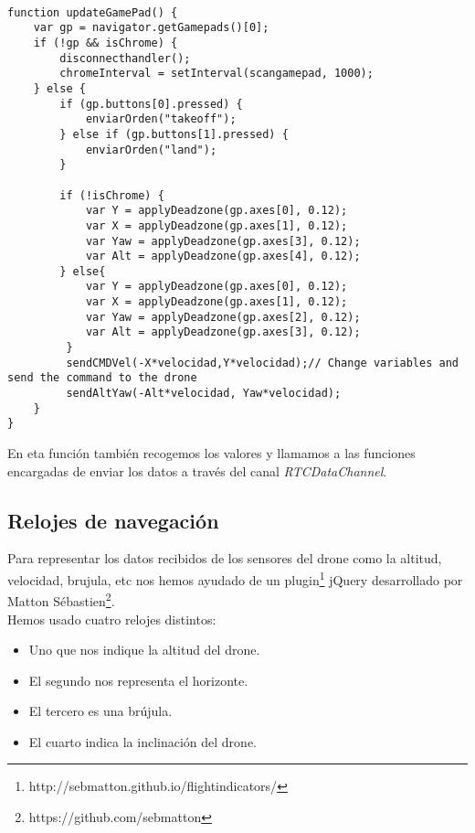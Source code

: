 \begin{lstlisting}[caption=Manajador de mando.]

function updateGamePad() {
    var gp = navigator.getGamepads()[0];
    if (!gp && isChrome) {
        disconnecthandler();
        chromeInterval = setInterval(scangamepad, 1000);        
    } else {
        if (gp.buttons[0].pressed) {
            enviarOrden("takeoff");
        } else if (gp.buttons[1].pressed) {
            enviarOrden("land");
        }
        
        if (!isChrome) {
            var Y = applyDeadzone(gp.axes[0], 0.12);
            var X = applyDeadzone(gp.axes[1], 0.12);
            var Yaw = applyDeadzone(gp.axes[3], 0.12);
            var Alt = applyDeadzone(gp.axes[4], 0.12);
        } else{
            var Y = applyDeadzone(gp.axes[0], 0.12);
            var X = applyDeadzone(gp.axes[1], 0.12);
            var Yaw = applyDeadzone(gp.axes[2], 0.12);
            var Alt = applyDeadzone(gp.axes[3], 0.12);
         }
         sendCMDVel(-X*velocidad,Y*velocidad);// Change variables and send the command to the drone
         sendAltYaw(-Alt*velocidad, Yaw*velocidad);
    }
}
\end{lstlisting}

En eta función también recogemos los valores y llamamos a las funciones encargadas de enviar los datos a través del canal \emph{RTCDataChannel}.\\


\subsection{Relojes de navegación}\label{subsec:relojesnavegacion}

Para representar los datos recibidos de los sensores del drone como la altitud, velocidad, brujula, etc nos hemos ayudado de un plugin\footnote{http://sebmatton.github.io/flightindicators/}\cite{jqueryflightindicator} jQuery desarrollado por Matton Sébastien\footnote{https://github.com/sebmatton}.\\

Hemos usado cuatro relojes distintos: 

\begin{itemize}
\item Uno que nos indique la altitud del drone.
\item El segundo nos representa el horizonte.
\item El tercero es una brújula.
\item El cuarto indica la inclinación del drone.
\end{itemize}

